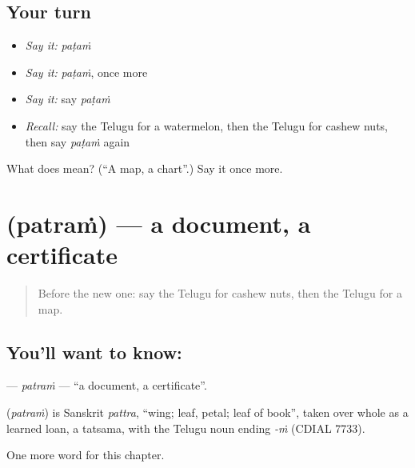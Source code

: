 \subsection*{Your turn}
\begin{itemize}
\raggedright
  \item \emph{Say it:} \emph{paṭaṁ}
  \item \emph{Say it:} \emph{paṭaṁ}, once more
  \item \emph{Say it:} say \emph{paṭaṁ}
  \item \emph{Recall:} say the Telugu for a watermelon, then the Telugu for cashew nuts, then say \emph{paṭaṁ} again
\end{itemize}

\begin{tcolorbox}[breakable,colback=teal!4,colframe=teal!35!black,title={Before you move on}]
What does  mean? (\textquotedblleft{}A map, a chart\textquotedblright{}.) Say it once more.
\end{tcolorbox}
\section[\texorpdfstring{\te{పత్రం} (patraṁ)}{పత్రం (patraṁ)}]{ (patraṁ) — a document, a certificate}

\label{lesson:TE-C226-patram}



\begin{quote}
Before the new one: say the Telugu for cashew nuts, then the Telugu for a map.
\end{quote}

\subsection*{You'll want to know: }
\textbf{} — \emph{patraṁ} — \textquotedblleft{}a document, a certificate\textquotedblright{}.

\begin{cousinweb}
\textbf{} (\emph{patraṁ}) is Sanskrit \emph{pattra}, \textquotedblleft{}wing; leaf, petal; leaf of book\textquotedblright{}, taken over whole as a learned loan, a tatsama, with the Telugu noun ending \emph{-ṁ} (CDIAL 7733).
\end{cousinweb}

\begin{grammarlens}[title={What you've built}]
One more word for this chapter.
\end{grammarlens}

